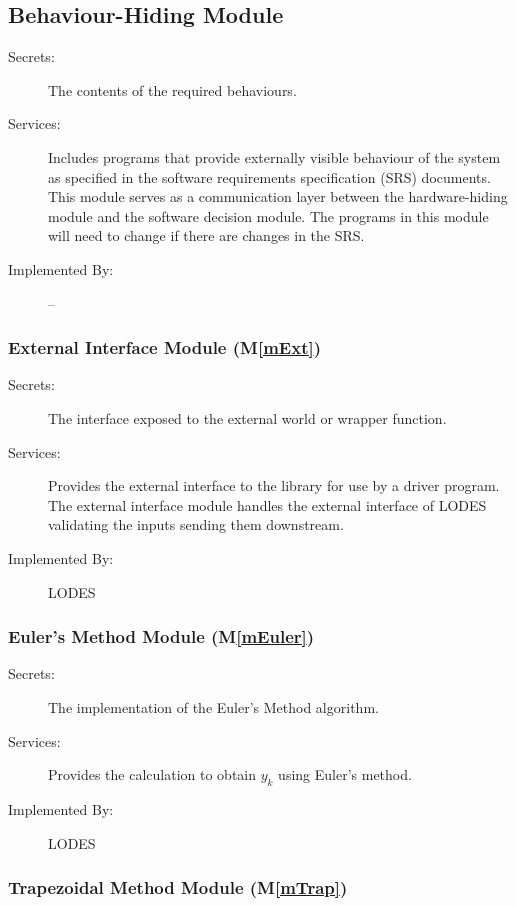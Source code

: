 \documentclass[12pt, titlepage]{article}
\newcommand{\mref}[1]{M\ref{#1}}
\begin{document}
\subsection{Behaviour-Hiding Module}

\begin{description}
\item[Secrets:]The contents of the required behaviours.
\item[Services:]Includes programs that provide externally visible behaviour of
  the system as specified in the software requirements specification (SRS)
  documents. This module serves as a communication layer between the
  hardware-hiding module and the software decision module. The programs in this
  module will need to change if there are changes in the SRS.
\item[Implemented By:] --
\end{description}

\subsubsection{External Interface Module (\mref{mExt})}

\begin{description}
\item[Secrets:]The interface exposed to the external world or wrapper function.
\item[Services:]Provides the external interface to the library for use by a driver program.
The external interface module handles the external interface of LODES validating the inputs
sending them downstream.
\item[Implemented By:] LODES
\end{description}

\subsubsection{Euler's Method Module (\mref{mEuler})}

\begin{description}
\item[Secrets:]The implementation of the Euler's Method algorithm.
\item[Services:]Provides the calculation to obtain $y_k$ using Euler's method.
\item[Implemented By:] LODES
\end{description}

\subsubsection{Trapezoidal Method Module (\mref{mTrap})}
\end{document}
